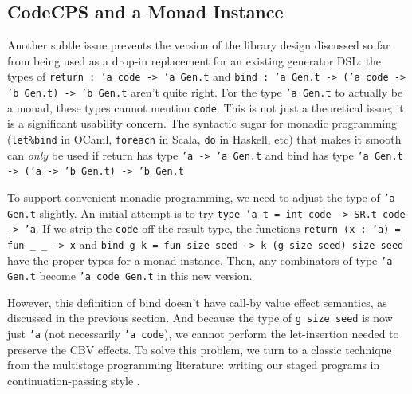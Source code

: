 \documentclass[acmsmall]{acmart}
\theoremstyle{definition}
\begin{document}
\subsection{CodeCPS and a Monad Instance}
\label{subsection:codecps}
Another subtle issue prevents the version of the library design discussed so far
from being used as a drop-in replacement for an existing generator DSL: the types of \texttt{return : 'a code -> 'a Gen.t}
and \texttt{bind : 'a Gen.t -> ('a code -> 'b Gen.t) -> 'b Gen.t} aren't quite right.
For the type \texttt{'a Gen.t} to actually be a monad,
these types cannot mention \texttt{code}. This is not just a theoretical issue; it is a significant usability concern.
The syntactic sugar for monadic programming (\texttt{let\%bind} in OCaml, \texttt{foreach} in Scala, \texttt{do} in Haskell, etc)
that makes it smooth can \emph{only} be used if
return has type \texttt{'a -> 'a Gen.t} and bind has type \texttt{'a Gen.t -> ('a -> 'b Gen.t) -> 'b Gen.t}

To support convenient monadic programming, we need to adjust the type of \texttt{'a Gen.t} slightly.
An initial attempt is to try \texttt{type 'a t = int code -> SR.t code -> 'a}. If we strip the \texttt{code} off the result type,
the functions \texttt{return (x : 'a) = fun \_ \_ -> x} and \texttt{bind g k = fun size seed -> k (g size seed) size seed}
have the proper types for a monad instance. Then, any combinators of type \texttt{'a Gen.t} become \texttt{'a code Gen.t} in this new version.

However, this definition of bind doesn't have call-by value effect semantics, as
discussed in the previous section.  And because the type of \texttt{g size seed} is
now just \texttt{'a} (not necessarily \texttt{'a code}), we cannot perform the
let-insertion needed to preserve the CBV effects. To solve this problem, we
turn to a classic technique from the multistage programming literature: writing
our staged programs in continuation-passing style \cite{bondorf92}.
\end{document}
